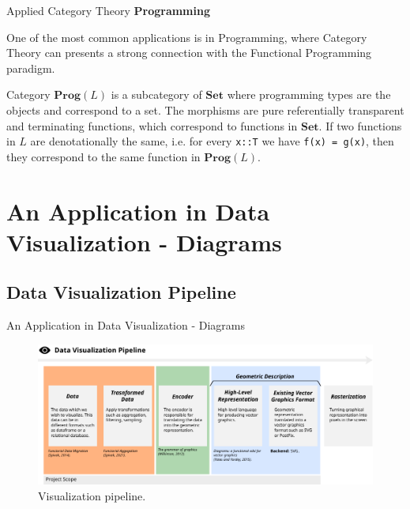 \documentclass[aspectratio=169,xcolor=dvipsnames,9pt]{beamer}
\newcommand{\pc}[1]{\lstinline{#1}}
\begin{document}
\begin{frame}[fragile]{Applied Category Theory}
	\textbf{Programming}
	\vspace{3mm}

	One of the most common applications is in Programming,
	where Category Theory can presents a strong connection with the Functional Programming paradigm.

	\begin{definition}
		Category $\mathbf{Prog}(L)$ is a subcategory of $\mathbf{Set}$ where programming
		types are the objects and correspond to a set. The morphisms are pure
		referentially transparent and terminating functions, which correspond to
		functions in $\mathbf{Set}$. If two functions in $L$ are denotationally the same,
		i.e. for every \pc{x::T} we have \pc{f(x) = g(x)}, then they correspond
		to the same function in $\mathbf{Prog}(L)$.
	\end{definition}
\end{frame}

\section[An Application in Data Visualization - Diagrams]{An Application in Data Visualization - Diagrams}
\subsection[Data Visualization Pipeline]{Data Visualization Pipeline}
\begin{frame}[fragile]{An Application in Data Visualization - Diagrams}

	\begin{figure}[h]
		\begin{center}
			\includegraphics[width=1\textwidth]{./figures/datavizscope.pdf}
		\end{center}
		\caption{Visualization pipeline.}
		\label{fig:datavizpipeline}
	\end{figure}
\end{frame}
\end{document}
